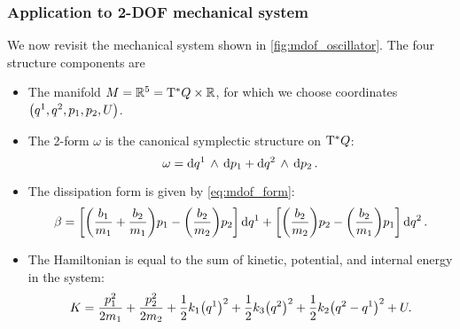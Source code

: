 \subsubsection{Application to 2-DOF mechanical system}
We now revisit the mechanical system shown in \cref{fig:mdof_oscillator}. The four structure components are
\begin{itemize}
    \item The manifold \(M = \mathbb{R}^5 = \mathrm{T}^*Q\times \mathbb{R}\), for which we choose coordinates \(\qty(q^1, q^2, p_1, p_2, U)\).
    \item The 2-form \(\omega\) is the canonical symplectic structure on \(\mathrm{T}^*Q\):
        \begin{equation}
     \omega =  \dd{q^1}\,\wedge\,\dd{p_1}  +  \dd{q^2}\,\wedge\,\dd{p_2} .
\end{equation}
    \item The dissipation form is given by \cref{eq:mdof_form}:
        \begin{equation}
     \beta =  \qty[\qty(\frac{b_1}{m_1} + \frac{b_2}{m_1}) p_1 - \qty(\frac{b_2}{m_2})p_2]\dd{q^1}
                          + \qty[\qty(\frac{b_2}{m_2})p_2 - \qty(\frac{b_2}{m_1})p_1]\dd{q^2}.
\end{equation}
    \item The Hamiltonian is equal to the sum of kinetic, potential, and internal energy in the system:
        \begin{equation}
     K = \frac{p^2_1}{2m_1} + \frac{p^2_2}{2m_2} + \frac{1}{2}k_1\qty(q^1)^2 + \frac{1}{2}k_3\qty(q^2)^2 + \frac{1}{2}k_2\qty(q^2 - q^1)^2 + U.
\end{equation}
\end{itemize}

